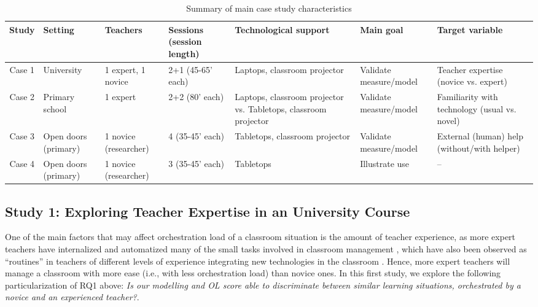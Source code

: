 \documentclass[10pt,journal,compsoc]{IEEEtran}
\begin{document}
\begin{table}[!t]
\caption{Summary of main case study characteristics}
\label{tab:cases}
\centering
\begin{tabular}{|c||p{1.5cm}|p{1.5cm}|p{2cm}|p{3.4cm}|p{2cm}|p{3.4cm}|}
\hline
Study & Setting & Teachers & Sessions (session length) & Technological support & Main goal & Target variable\\
\hline
\hline
Case 1 & University & 1 expert, 1 novice & 2+1 (45-65' each) & Laptops, classroom projector & Validate measure/model & Teacher expertise (novice vs. expert) \\
\hline
Case 2 & Primary school & 1 expert & 2+2 (80' each) & Laptops, classroom projector vs. Tabletops, classroom projector & Validate measure/model & Familiarity with technology (usual vs. novel) \\
\hline
Case 3 & Open doors (primary) & 1 novice (researcher) & 4 (35-45' each) & Tabletops, classroom projector & Validate measure/model & External (human) help (without/with helper) \\
\hline
Case 4 & Open doors (primary) & 1 novice (researcher) & 3 (35-45' each) & Tabletops & Illustrate use & -- \\
\hline
\end{tabular}
\end{table}



\subsection{Study 1: Exploring Teacher Expertise in an University Course}
\label{sec:study1}

One of the main factors that may affect orchestration load of a classroom situation is the amount of teacher experience, as more expert teachers have internalized and automatized many of the small tasks involved in classroom management \cite{feldon2007cognitive}, which have also been observed as ``routines'' in teachers of different levels of experience integrating new technologies in the classroom \cite{prieto2011recurrent}. Hence, more expert teachers will manage a classroom with more ease (i.e., with less orchestration load) than novice ones. In this first study, we explore the following particularization of RQ1 above: \textit{Is our modelling and OL score able to discriminate between similar learning situations, orchestrated by a novice and an experienced teacher?}.
\end{document}
